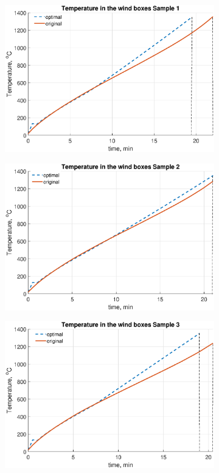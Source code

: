 \documentclass[AMS,STIX2COL]{WileyNJD-v2}
\begin{document}
\begin{figure}
	\centering
	\begin{subfigure}{.5\textwidth}
		\centering
		\includegraphics[width=1\linewidth]{6a.eps}
	\end{subfigure}%
	\begin{subfigure}{.5\textwidth}
		\centering
		\includegraphics[width=1\linewidth]{6b.eps}
	\end{subfigure}
	\begin{subfigure}{.5\textwidth}
	\centering
	\includegraphics[width=1\linewidth]{6c.eps}

\end{subfigure}
\end{figure}
\end{document}

